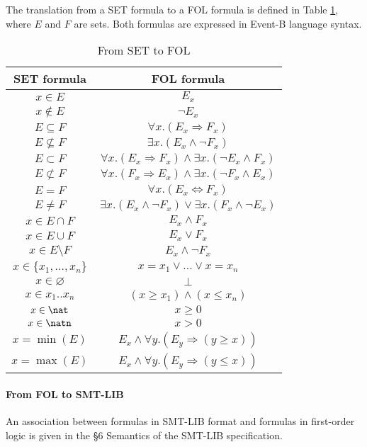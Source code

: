 The translation from a SET formula to a FOL formula is defined in Table \ref{SET2FOL}, where $E$ and $F$ are sets. Both formulas are expressed in Event-B language syntax. 
\begin{table}[htbp]
\begin{center}
\begin{tabular}{|c|c|}
 \hline
 \textbf{SET formula} & \textbf{FOL formula} \\ 
 \hline
 $x \in E$ & $E_x$ \\ 
 $x \notin E$ & $\neg E_x$ \\
 $E \subseteq F$ & $\forall{x}.(E_x \Rightarrow F_x)$ \\ 
 $E \nsubseteq F$ & $\exists{x}.(E_x \wedge \neg F_x)$ \\ 
 $E \subset F$ & $\forall{x}.(E_x \Rightarrow F_x) \wedge \exists{x}.(\neg E_x \wedge F_x)$ \\ 
 $E \not\subset F$ & $\forall{x}.(F_x \Rightarrow E_x) \wedge \exists{x}.(\neg F_x \wedge E_x)$ \\ 
 $E = F$ & $\forall{x}.(E_x \Longleftrightarrow F_x)$ \\ 
 $E \neq F$ & $\exists{x}.(E_x \wedge \neg F_x) \vee \exists{x}.(F_x \wedge \neg E_x)$ \\ 
 $x \in E \cap F$ & $E_x \wedge F_x$ \\ 
 $x \in E \cup F$ & $E_x \vee F_x$ \\ 
 $x \in E \setminus F$ & $E_x \wedge \neg F_x$ \\
 $x \in \{x_1, ..., x_n\}$ & $x = x_1 \vee ... \vee x = x_n$ \\
 $x \in \varnothing$ & $\perp$ \\
 $x \in x_1 .. x_n$ & $(x \geqslant x_1) \wedge (x \leqslant x_n)$ \\
 $x \in \nat$ & $x \geqslant 0$ \\
 $x \in \natn$ & $x > 0$ \\
 $x = \min(E)$ & $ E_x \wedge \forall{y}.(E_y \Rightarrow (y \geqslant x))$ \\
 $x = \max(E)$ & $ E_x \wedge \forall{y}.(E_y \Rightarrow (y \leqslant x))$ \\
 \hline
\end{tabular} 
\end{center}
\caption{From SET to FOL}
\label{SET2FOL}
\end{table}

\paragraph{From FOL to SMT-LIB}
An association between formulas in SMT-LIB format and formulas in first-order logic is given in the \S6 Semantics of the SMT-LIB specification\cite{SMTLIB06}.

